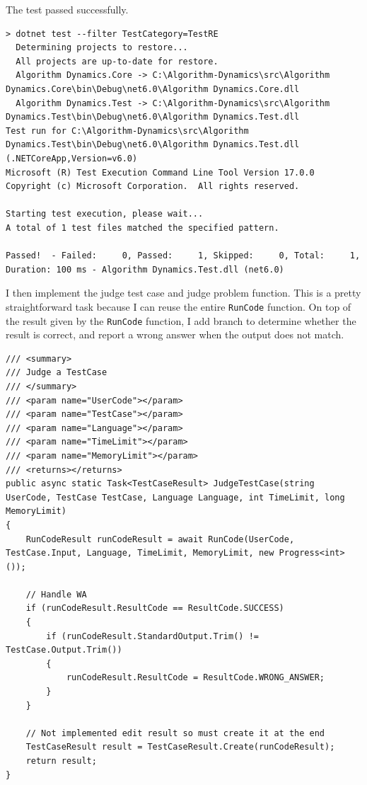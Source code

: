 \documentclass[a4paper]{report}
\newcommand{\code}{\texttt}
\begin{document}
The test passed successfully.

\begin{verbatim}
> dotnet test --filter TestCategory=TestRE
  Determining projects to restore...
  All projects are up-to-date for restore.
  Algorithm Dynamics.Core -> C:\Algorithm-Dynamics\src\Algorithm Dynamics.Core\bin\Debug\net6.0\Algorithm Dynamics.Core.dll
  Algorithm Dynamics.Test -> C:\Algorithm-Dynamics\src\Algorithm Dynamics.Test\bin\Debug\net6.0\Algorithm Dynamics.Test.dll
Test run for C:\Algorithm-Dynamics\src\Algorithm Dynamics.Test\bin\Debug\net6.0\Algorithm Dynamics.Test.dll (.NETCoreApp,Version=v6.0)
Microsoft (R) Test Execution Command Line Tool Version 17.0.0
Copyright (c) Microsoft Corporation.  All rights reserved.

Starting test execution, please wait...
A total of 1 test files matched the specified pattern.

Passed!  - Failed:     0, Passed:     1, Skipped:     0, Total:     1, Duration: 100 ms - Algorithm Dynamics.Test.dll (net6.0)
\end{verbatim}

I then implement the judge test case and judge problem function. This is a pretty straightforward task because I can reuse the entire \code{RunCode} function. On top of the result given by the \code{RunCode} function, I add branch to determine whether the result is correct, and report a wrong answer when the output does not match.

\begin{verbatim}
/// <summary>
/// Judge a TestCase
/// </summary>
/// <param name="UserCode"></param>
/// <param name="TestCase"></param>
/// <param name="Language"></param>
/// <param name="TimeLimit"></param>
/// <param name="MemoryLimit"></param>
/// <returns></returns>
public async static Task<TestCaseResult> JudgeTestCase(string UserCode, TestCase TestCase, Language Language, int TimeLimit, long MemoryLimit)
{
    RunCodeResult runCodeResult = await RunCode(UserCode, TestCase.Input, Language, TimeLimit, MemoryLimit, new Progress<int>());
    
    // Handle WA
    if (runCodeResult.ResultCode == ResultCode.SUCCESS)
    {
        if (runCodeResult.StandardOutput.Trim() != TestCase.Output.Trim())
        {
            runCodeResult.ResultCode = ResultCode.WRONG_ANSWER;
        }
    }

    // Not implemented edit result so must create it at the end
    TestCaseResult result = TestCaseResult.Create(runCodeResult);
    return result;
}
\end{verbatim}
\end{document}
